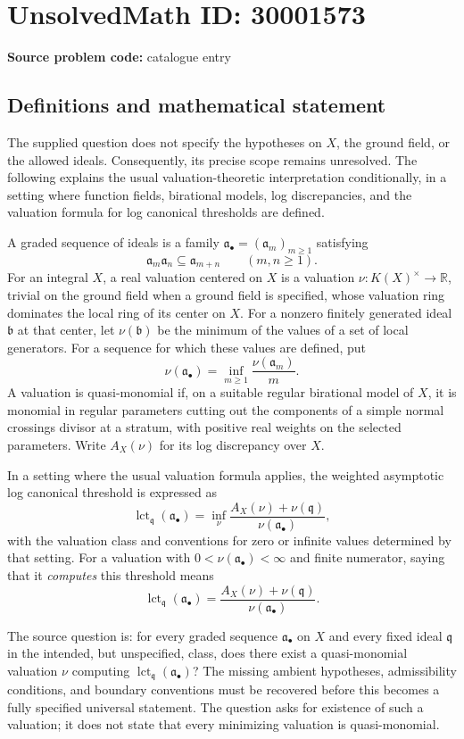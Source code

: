 \documentclass[11pt]{article}
\newcommand{\R}{\mathbb{R}}
\begin{document}
\section*{UnsolvedMath ID: 30001573}
\textbf{Source problem code:} catalogue entry
\subsection{Definitions and mathematical statement}
The supplied question does not specify the hypotheses on \(X\), the ground field, or the allowed ideals. Consequently, its precise scope remains unresolved. The following explains the usual valuation-theoretic interpretation conditionally, in a setting where function fields, birational models, log discrepancies, and the valuation formula for log canonical thresholds are defined.

A graded sequence of ideals is a family \(\mathfrak a_\bullet=(\mathfrak a_m)_{m\geq 1}\) satisfying
\[
\mathfrak a_m\mathfrak a_n\subseteq\mathfrak a_{m+n}\qquad(m,n\geq 1).
\]
For an integral \(X\), a real valuation centered on \(X\) is a valuation \(\nu:K(X)^\times\to\R\), trivial on the ground field when a ground field is specified, whose valuation ring dominates the local ring of its center on \(X\). For a nonzero finitely generated ideal \(\mathfrak b\) at that center, let \(\nu(\mathfrak b)\) be the minimum of the values of a set of local generators. For a sequence for which these values are defined, put
\[
\nu(\mathfrak a_\bullet)=\inf_{m\geq 1}\frac{\nu(\mathfrak a_m)}{m}.
\]
A valuation is quasi-monomial if, on a suitable regular birational model of \(X\), it is monomial in regular parameters cutting out the components of a simple normal crossings divisor at a stratum, with positive real weights on the selected parameters. Write \(A_X(\nu)\) for its log discrepancy over \(X\).

In a setting where the usual valuation formula applies, the weighted asymptotic log canonical threshold is expressed as
\[
\operatorname{lct}_{\mathfrak q}(\mathfrak a_\bullet)
=\inf_{\nu}\frac{A_X(\nu)+\nu(\mathfrak q)}{\nu(\mathfrak a_\bullet)},
\]
with the valuation class and conventions for zero or infinite values determined by that setting. For a valuation with \(0<\nu(\mathfrak a_\bullet)<\infty\) and finite numerator, saying that it \emph{computes} this threshold means
\[
\operatorname{lct}_{\mathfrak q}(\mathfrak a_\bullet)
=\frac{A_X(\nu)+\nu(\mathfrak q)}{\nu(\mathfrak a_\bullet)}.
\]

The source question is: for every graded sequence \(\mathfrak a_\bullet\) on \(X\) and every fixed ideal \(\mathfrak q\) in the intended, but unspecified, class, does there exist a quasi-monomial valuation \(\nu\) computing \(\operatorname{lct}_{\mathfrak q}(\mathfrak a_\bullet)\)? The missing ambient hypotheses, admissibility conditions, and boundary conventions must be recovered before this becomes a fully specified universal statement. The question asks for existence of such a valuation; it does not state that every minimizing valuation is quasi-monomial.
\end{document}
